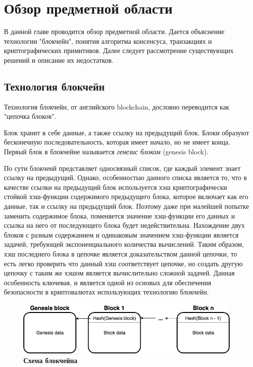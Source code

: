 
\graphicspath{ {images/} }

\startrelatedwork

\chapter{Обзор предметной области} \label{chapter1}
В данной главе проводится обзор предметной области.
Дается объяснение технологии "блокчейн", понятия алгоритма консенсуса, транзакциях и
криптографических примитивов.
Далее следует рассмотрение существующих решений и описание их недостатков.

\section{Технология блокчейн}

Технология блокчейн, от английского blockchain, дословно переводится  как "цепочка блоков".

Блок хранит в себе данные, а также ссылку на предыдущий блок. 
Блоки образуют бесконечную последовательность, которая имеет начало, но не имеет конца.
Первый блок в блокчейне называется \textit{генезис блоком} (genesis block).

По сути блокченй представляет односвязный список, где каждый элемент знает ссылку на предыдущий. 
Однако, особенностью данного списка является то,  что в качестве ссылки на предыдущий блок 
используется хэш криптографически стойкой хэш-функции содержимого предыдущего блока, 
которое включает как его данные, так и ссылку на предыдущий блок. 
Поэтому даже при малейшей попытке заменить содержимое блока, 
поменяется значение хэш-функции его данных и ссылка на него от последующего блока будет недействительна.
Нахождение двух блоков с разным содержанием и одинаковым значением хэш-функции является  задачей, требующей экспоненциального количества вычислений. 
Таким образом, хэш последнего блока в цепочке является доказательством данной цепочки, то есть легко проверить что данный хэш соответствует цепочке, но создать другую цепочку с таким же хэшом является вычислительно сложной задачей. Данная особенность ключевая, и  является одной из основых для обеспечения безопасности в криптовалютах использующих технологию блокчейн.

\begin{figure}[h]
\includegraphics[scale=0.6]{Blockchain_Scheme}
\caption{\textbf{Схема блокчейна}}
\label{fig:blockchain}
\end{figure}

